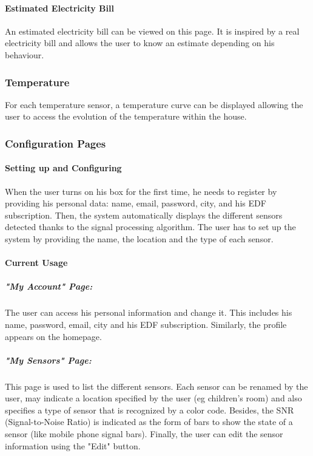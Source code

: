     \paragraph{Estimated Electricity Bill}
    An estimated electricity bill can be viewed on this page. It is inspired by a real electricity bill and allows the user to know an estimate depending on his behaviour.
\subsubsection{Temperature}
    For each temperature sensor, a temperature curve can be displayed allowing the user to access the evolution of the temperature within the house. 
\subsubsection{Configuration Pages}
    
    \paragraph{Setting up and Configuring} %
    
    When the user turns on his box for the first time, he needs to register by providing his personal data: name, email, password, city, and his EDF subscription. Then, the system automatically displays the different sensors detected thanks to the signal processing algorithm. The user has to set up the system by providing the name, the location and the type of each sensor. %
    
    \paragraph{Current Usage} %
    
    \subparagraph{"My Account" Page:} 
    The user can access his personal information and change it. This includes his name, password, email, city and his EDF subscription. Similarly, the profile appears on the homepage.
    
    \subparagraph{"My Sensors" Page:}
    This page is used to list the different sensors. Each sensor can be renamed by the user, may indicate a location specified by the user (eg children's room) and also specifies a type of sensor that is recognized by a color code. Besides, the SNR (Signal-to-Noise Ratio) is indicated as the form of bars to show the state of a sensor (like mobile phone signal bars). Finally, the user can edit the sensor information using the "Edit" button.